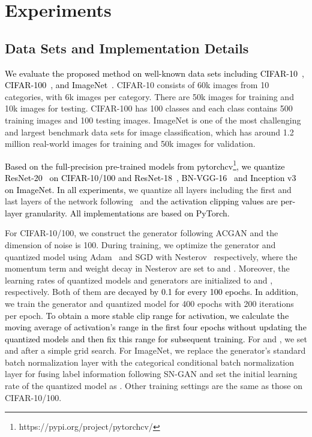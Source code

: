 \documentclass[runningheads]{llncs}
\def\lhk{\textcolor{black}}
\def\xsk{\textcolor{black}}
\def\jing{\textcolor{black}}
\def\new{\textcolor{black}}
\begin{document}
\section{Experiments}
\setcounter{footnote}{0}

\subsection{Data Sets and Implementation Details}
\jing{
We evaluate the proposed method on well-known data sets including CIFAR-10~\cite{krizhevsky2009learning}, CIFAR-100~\cite{krizhevsky2009learning}, and ImageNet~\cite{deng2009imagenet}.} CIFAR-10 consists of 60k images from 10 categories, with 6k images per category. There are 50k images for training and 10k images for testing. CIFAR-100 has 100 classes and each class contains 500 training images and 100 testing images. ImageNet is one of the most challenging and largest benchmark data sets for image classification, which has around 1.2 million real-world images for training and 50k images for validation. 

\jing{
Based on the full-precision pre-trained models from pytorchcv\footnote{https://pypi.org/project/pytorchcv/}, we quantize ResNet-20~\cite{he2016deep} on CIFAR-10/100 and ResNet-18~\cite{he2016deep}, BN-VGG-16~\cite{SimonyanZ14a} and Inception v3~\cite{szegedy2016rethinking} on ImageNet.} \new{In all experiments,} we quantize all layers including the first and last layers of the network following~\cite{Cai_2020_CVPR} and \new{the activation clipping values are per-layer granularity.} \lhk{All implementations are based on PyTorch.}

For CIFAR-10/100, we construct the generator following ACGAN \cite{odena2017conditional} and the dimension of noise is 100. 
During training, we optimize the generator and quantized model using  Adam~\cite{KingmaB14} and SGD with Nesterov~\cite{nesterov1983method} respectively, where the momentum term and weight decay in Nesterov are set to  and .
Moreover, the learning rates of quantized models and generators are initialized to  and , respectively. 
Both of them \xsk{are decayed by 0.1 for every 100 epochs.}
\new{In addition}, we train the generator and quantized model for 400 epochs with 200 iterations per epoch. 
\lhk{To obtain a more stable clip range for activation, we calculate the moving average of activation's range in the first four epochs without updating the quantized models and then fix this range for subsequent training.}
For  and , we set  and  after a simple grid search.
For ImageNet, we replace the generator's standard batch normalization layer with the categorical conditional batch normalization layer for fusing label information following SN-GAN \cite{miyato2018spectral} and set the initial learning rate of the quantized model as . Other training settings are the same as those on CIFAR-10/100. 
\end{document}
